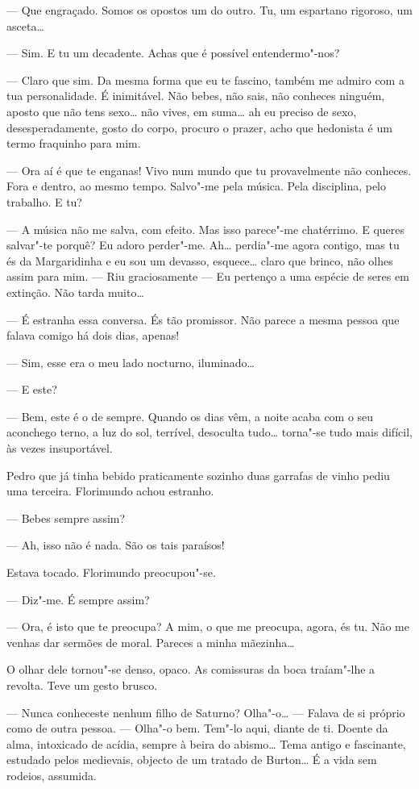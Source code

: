 --- Que engraçado. Somos os opostos um do outro. Tu, um espartano
rigoroso, um asceta\ldots{}

--- Sim. E tu um decadente. Achas que é possível entendermo"-nos?

--- Claro que sim. Da mesma forma que eu te fascino, também me admiro com
a tua personalidade. É inimitável. Não bebes, não sais, não conheces
ninguém, aposto que não tens sexo\ldots{} não vives, em suma\ldots{} ah eu
preciso de sexo, desesperadamente, gosto do corpo, procuro o prazer,
acho que hedonista é um termo fraquinho para mim.

--- Ora aí é que te enganas! Vivo num mundo que tu provavelmente não
conheces. Fora e dentro, ao mesmo tempo. Salvo"-me pela música. Pela
disciplina, pelo trabalho. E tu?

--- A música não me salva, com efeito. Mas isso parece"-me chatérrimo. E
queres salvar"-te porquê? Eu adoro perder"-me. Ah\ldots{} perdia"-me agora
contigo, mas tu és da Margaridinha e eu sou um devasso,
esquece\ldots{} claro que brinco, não olhes assim para mim. ---  Riu
graciosamente --- Eu pertenço a uma espécie de seres em extinção. Não
tarda muito\ldots{}

--- É estranha essa conversa. És tão promissor. Não parece a mesma pessoa
que falava comigo há dois dias, apenas!

--- Sim, esse era o meu lado nocturno, iluminado\ldots{}

--- E este?

--- Bem, este é o de sempre. Quando os dias vêm, a noite acaba com o seu
aconchego terno, a luz do sol, terrível, desoculta tudo\ldots{} torna"-se tudo
mais difícil, às vezes insuportável.

Pedro que já tinha bebido praticamente sozinho duas garrafas de vinho
pediu uma terceira. Florimundo achou estranho.

--- Bebes sempre assim?

--- Ah, isso não é nada. São os tais paraísos!

Estava tocado. Florimundo preocupou"-se.

--- Diz"-me. É sempre assim?

--- Ora, é isto que te preocupa? A mim, o que me preocupa, agora, és tu.
Não me venhas dar sermões de moral. Pareces a minha mãezinha\ldots{}

O olhar dele tornou"-se denso, opaco. As comissuras da boca traíam"-lhe a
revolta. Teve um gesto brusco.

--- Nunca conheceste nenhum filho de Saturno? Olha"-o\ldots{} --- Falava de si
próprio como de outra pessoa. --- Olha"-o bem. Tem"-lo aqui, diante de ti.
Doente da alma, intoxicado de acídia, sempre à beira do abismo\ldots{} Tema
antigo e fascinante, estudado pelos medievais, objecto de um tratado de
Burton\ldots{} É a vida sem rodeios, assumida.

